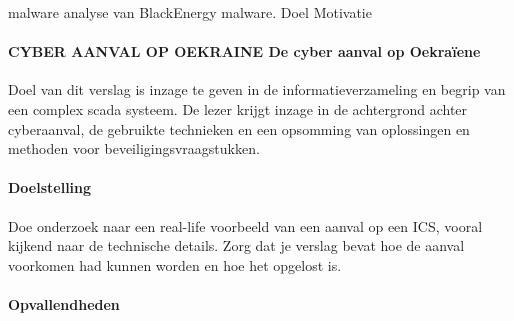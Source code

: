 






malware analyse van BlackEnergy malware.
Doel
Motivatie


\paragraph{CYBER AANVAL OP OEKRAINE De cyber aanval op Oekraïene}


Doel van dit verslag is inzage te geven in de informatieverzameling en begrip van een complex scada
systeem. De lezer krijgt inzage in de achtergrond achter cyberaanval, de gebruikte technieken en
een opsomming van oplossingen en methoden voor beveiligingsvraagstukken.
\paragraph{Doelstelling}

Doe onderzoek naar een real-life voorbeeld van een aanval op een ICS,
vooral kijkend naar de technische details.
Zorg dat je verslag bevat hoe de aanval voorkomen had kunnen worden en
hoe het opgelost is.



\paragraph{Opvallendheden}


